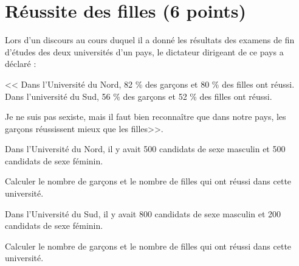 \section{Réussite des filles (6 points)}

Lors d'un discours au cours duquel il a donné les résultats des examens de fin d'études des deux universités d'un pays, le dictateur dirigeant de ce pays a déclaré :

<< Dans l'Université du Nord, 82 \% des garçons et 80 \% des filles ont réussi. Dans l'université du Sud, 56 \% des garçons et 52 \% des filles ont réussi.

Je ne suis pas sexiste, mais il faut bien reconnaître que dans notre pays, les garçons réussissent mieux que les filles>>.

\begin{questions}
	\question[1\half] Dans l'Université du Nord, il y avait 500 candidats de sexe masculin et 500 candidats de sexe féminin.
	
	Calculer le nombre de garçons et le nombre de filles qui ont réussi dans cette université.
	
	\question[1\half] Dans l'Université du Sud, il y avait 800 candidats de sexe masculin et 200 candidats de sexe féminin.
	
	Calculer le nombre de garçons et le nombre de filles qui ont réussi dans cette université.
	
	\question
\end{questions}